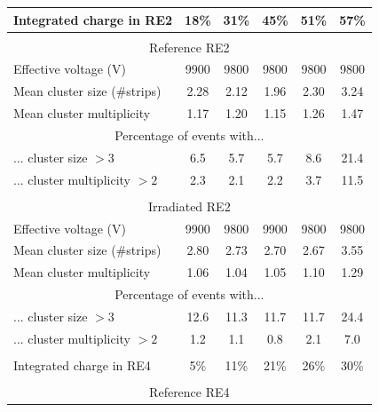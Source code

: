 	\begin{table}[H]
		\centering
		\begin{tabular}{|l|*{5}{c|}}
			\hline
			Integrated charge in RE2      & 18\% & 31\% & 45\% & 51\% & 57\% \\
			\hline
			\multicolumn{6}{c}{}                                             \\
			\hline
			\multicolumn{6}{|c|}{Reference RE2}                              \\
			\hline
			Effective voltage (V)         & 9900 & 9800 & 9800 & 9800 & 9800 \\
			\hline
			Mean cluster size (\#strips)  & 2.28 & 2.12 & 1.96 & 2.30 & 3.24 \\
			\hline
			Mean cluster multiplicity     & 1.17 & 1.20 & 1.15 & 1.26 & 1.47 \\
			\hline
			\multicolumn{6}{|c|}{Percentage of events with...}               \\
			\hline
			... cluster size $>3$         & 6.5  & 5.7  & 5.7  & 8.6  & 21.4 \\
			\hline
			... cluster multiplicity $>2$ & 2.3  & 2.1  & 2.2  & 3.7  & 11.5 \\
			\hline
			\multicolumn{6}{c}{}                                             \\
			\hline
			\multicolumn{6}{|c|}{Irradiated RE2}                             \\
			\hline
			Effective voltage (V)         & 9900 & 9800 & 9900 & 9800 & 9800 \\
			\hline
			Mean cluster size (\#strips)  & 2.80 & 2.73 & 2.70 & 2.67 & 3.55 \\
			\hline
			Mean cluster multiplicity     & 1.06 & 1.04 & 1.05 & 1.10 & 1.29 \\
			\hline
			\multicolumn{6}{|c|}{Percentage of events with...}               \\
			\hline
			... cluster size $>3$         & 12.6 & 11.3 & 11.7 & 11.7 & 24.4 \\
			\hline
			... cluster multiplicity $>2$ & 1.2  & 1.1  & 0.8  & 2.1  & 7.0  \\
			\hline
			\multicolumn{6}{c}{}                                             \\
			\hline
			Integrated charge in RE4      & 5\%  & 11\% & 21\% & 26\% & 30\% \\
			\hline
			\multicolumn{6}{c}{}                                             \\
			\hline
			\multicolumn{6}{|c|}{Reference RE4}                              \\

\end{tabular}
\end{table}
